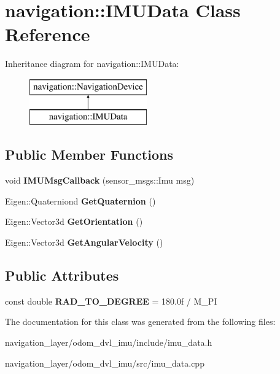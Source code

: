 \hypertarget{classnavigation_1_1IMUData}{}\section{navigation\+:\+:I\+M\+U\+Data Class Reference}
\label{classnavigation_1_1IMUData}
Inheritance diagram for navigation\+:\+:I\+M\+U\+Data\+:\begin{figure}[H]
\begin{center}
\leavevmode
\includegraphics[height=2.000000cm]{classnavigation_1_1IMUData}
\end{center}
\end{figure}
\subsection*{Public Member Functions}
\begin{DoxyCompactItemize}
\item 
\mbox{\label{classnavigation_1_1IMUData_a56f1c6d51df94b59ff64c1d0521f10df}} 
void {\bfseries I\+M\+U\+Msg\+Callback} (sensor\+\_\+msgs\+::\+Imu msg)
\item 
\mbox{\label{classnavigation_1_1IMUData_a3aa9b882f36194d91420e3515d6ae2b1}} 
Eigen\+::\+Quaterniond {\bfseries Get\+Quaternion} ()
\item 
\mbox{\label{classnavigation_1_1IMUData_a2e0cf1bcc3e0123beb9f33bafee823bc}} 
Eigen\+::\+Vector3d {\bfseries Get\+Orientation} ()
\item 
\mbox{\label{classnavigation_1_1IMUData_aca709ec30e406aba9a4270b72784cb65}} 
Eigen\+::\+Vector3d {\bfseries Get\+Angular\+Velocity} ()
\end{DoxyCompactItemize}
\subsection*{Public Attributes}
\begin{DoxyCompactItemize}
\item 
\mbox{\label{classnavigation_1_1IMUData_afa6279c235420123416323ced87e7103}} 
const double {\bfseries R\+A\+D\+\_\+\+T\+O\+\_\+\+D\+E\+G\+R\+EE} = 180.\+0f / M\+\_\+\+PI
\end{DoxyCompactItemize}


The documentation for this class was generated from the following files\+:\begin{DoxyCompactItemize}
\item 
navigation\+\_\+layer/odom\+\_\+dvl\+\_\+imu/include/imu\+\_\+data.\+h\item 
navigation\+\_\+layer/odom\+\_\+dvl\+\_\+imu/src/imu\+\_\+data.\+cpp\end{DoxyCompactItemize}
